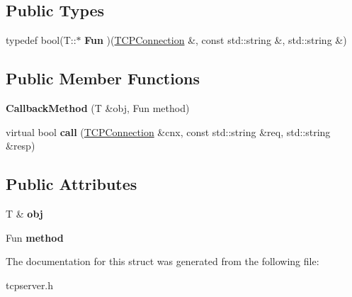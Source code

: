\subsection*{Public Types}
\begin{DoxyCompactItemize}
\item 
\hypertarget{structcppu_1_1TCPServer_1_1CallbackMethod_a2911cc72786a989aa57c660248ffb44c}{typedef bool(T\+::$\ast$ {\bfseries Fun} )(\hyperlink{classcppu_1_1TCPConnection}{T\+C\+P\+Connection} \&, const std\+::string \&, std\+::string \&)}\label{structcppu_1_1TCPServer_1_1CallbackMethod_a2911cc72786a989aa57c660248ffb44c}

\end{DoxyCompactItemize}
\subsection*{Public Member Functions}
\begin{DoxyCompactItemize}
\item 
\hypertarget{structcppu_1_1TCPServer_1_1CallbackMethod_a0c6ceee6db8c67ef56fb26d1df52140f}{{\bfseries Callback\+Method} (T \&obj, Fun method)}\label{structcppu_1_1TCPServer_1_1CallbackMethod_a0c6ceee6db8c67ef56fb26d1df52140f}

\item 
\hypertarget{structcppu_1_1TCPServer_1_1CallbackMethod_a0c11039d0ed983c03a614d0764df3793}{virtual bool {\bfseries call} (\hyperlink{classcppu_1_1TCPConnection}{T\+C\+P\+Connection} \&cnx, const std\+::string \&req, std\+::string \&resp)}\label{structcppu_1_1TCPServer_1_1CallbackMethod_a0c11039d0ed983c03a614d0764df3793}

\end{DoxyCompactItemize}
\subsection*{Public Attributes}
\begin{DoxyCompactItemize}
\item 
\hypertarget{structcppu_1_1TCPServer_1_1CallbackMethod_ae480535d346efc119fb5c43880f349c8}{T \& {\bfseries obj}}\label{structcppu_1_1TCPServer_1_1CallbackMethod_ae480535d346efc119fb5c43880f349c8}

\item 
\hypertarget{structcppu_1_1TCPServer_1_1CallbackMethod_aab858a039ddee71fb65a0e35c173f067}{Fun {\bfseries method}}\label{structcppu_1_1TCPServer_1_1CallbackMethod_aab858a039ddee71fb65a0e35c173f067}

\end{DoxyCompactItemize}


The documentation for this struct was generated from the following file\+:\begin{DoxyCompactItemize}
\item 
tcpserver.\+h\end{DoxyCompactItemize}
